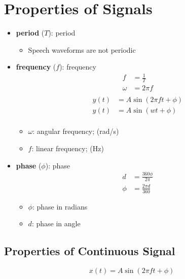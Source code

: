\section{Properties of Signals}

  \begin{itemize}
    \item \textbf{\Gls{period}} ($ T $): \glsdesc{period}
    \begin{itemize}
      \item Speech waveforms are not periodic
    \end{itemize}

    \item \textbf{\Gls{frequency}} ($ f $): \glsdesc{frequency}
    \begin{align}
      f &= \frac{1}{T} \\
      \omega &= 2 \pi f \\
    \end{align}
    \begin{align*}
      y\left( t \right) &= A \sin\left( 2\pi f t + \phi \right) \\
      y\left( t \right) &= A \sin\left( w t + \phi \right) \\
    \end{align*}
    \begin{itemize}
      \item $ \omega $: angular frequency; (rad/s)
      \item $ f $: linear frequency; (Hz)
    \end{itemize}

    \item \textbf{\Gls{phase}} ($ \phi $): \glsdesc{phase}
    \begin{align}
      d &= \frac{360 \phi}{2 \pi} \\
      \phi &= \frac{2 \pi d}{360}
    \end{align}
    \begin{itemize}
      \item $ \phi $: phase in radians
      \item $ d $: phase in angle
    \end{itemize}
  \end{itemize}

  \subsection{Properties of Continuous Signal}

    \begin{equation*}
      x\left( t \right) = A \sin\left( 2\pi f t + \phi \right)
    \end{equation*}

